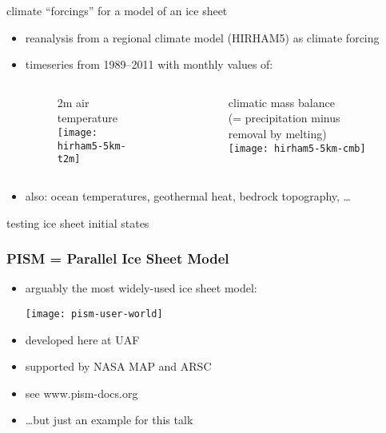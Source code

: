 \documentclass[hide notes,intlimits]{beamer}
\begin{document}
\begin{frame}{climate ``forcings'' for a model of an ice sheet}
  \begin{itemize}
  \item reanalysis from a regional climate model \scriptsize (HIRHAM5) \normalsize as climate forcing
  \item timeseries from 1989--2011 with monthly values of:

  \bigskip

 \begin{columns}[c]
    \begin{column}{.5\linewidth}
      \vspace{-.5cm}
      \begin{figure}
        2m air temperature \phantom{$\bigg|$} \\
        \texttt{[image: hirham5-5km-t2m]}
     \end{figure}
    \end{column}
    \begin{column}{.5\linewidth}
      \vspace{-.5cm}
      \begin{figure}
        climatic mass balance\\
        \scriptsize (= precipitation minus removal by melting) \normalsize\\
        \texttt{[image: hirham5-5km-cmb]}
     \end{figure}
    \end{column}
  \end{columns}

  \item also: ocean temperatures, geothermal heat, bedrock topography, \dots
  \end{itemize}
\end{frame}


\begin{frame}{testing ice sheet initial states}
  \begin{figure}
    
  \end{figure}
\end{frame}


\begin{frame}
  \frametitle{PISM = Parallel Ice Sheet Model}

  \begin{itemize}
  \item arguably the most widely-used ice sheet model:
     \begin{center}
        \texttt{[image: pism-user-world]}
     \end{center}
  \item developed here at UAF
  \item supported by NASA MAP and ARSC
  \item see \alert{www.pism-docs.org}
  \item \dots but just an example for this talk
  \end{itemize}
\end{frame}
\end{document}
